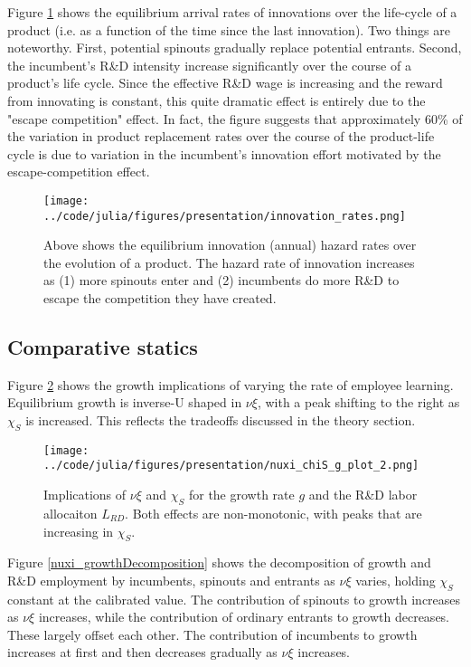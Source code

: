 \documentclass[12pt,english]{article}
\theoremstyle{remark}
\begin{document}
Figure \ref{innovation_rates} shows the equilibrium arrival rates of innovations over the life-cycle of a product (i.e. as a function of the time since the last innovation). Two things are noteworthy. First, potential spinouts gradually replace potential entrants. Second, the incumbent's R\&D intensity increase significantly over the course of a product's life cycle. Since the effective R\&D wage is increasing and the reward from innovating is constant, this quite dramatic effect is entirely due to the "escape competition" effect. In fact, the figure suggests that approximately 60\% of the variation in product replacement rates over the course of the product-life cycle is due to variation in the incumbent's innovation effort motivated by the escape-competition effect.

\begin{figure}[h] 
	\centering
	\texttt{[image: ../code/julia/figures/presentation/innovation\_rates.png]}
	\caption{Above shows the equilibrium innovation (annual) hazard rates over the evolution of a product. The hazard rate of innovation increases as (1) more spinouts enter and (2) incumbents do more R\&D to escape the competition they have created.}
	\label{innovation_rates}
\end{figure}

\subsection{Comparative statics}

Figure \ref{nuxi_chiS_gCompStat} shows the growth implications of varying the rate of employee learning. Equilibrium growth is inverse-U shaped in $\nu \xi$, with a peak shifting to the right as $\chi_S$ is increased. This reflects the tradeoffs discussed in the theory section.

\begin{figure}[h] 
	\centering
	\texttt{[image: ../code/julia/figures/presentation/nuxi\_chiS\_g\_plot\_2.png]}
	\caption{Implications of $\nu \xi$ and $\chi_S$ for the growth rate $g$ and the R\&D labor allocaiton $L_{RD}$. Both effects are non-monotonic, with peaks that are increasing in $\chi_S$.}
	\label{nuxi_chiS_gCompStat}
\end{figure}

Figure \ref{nuxi_growthDecomposition} shows the decomposition of growth and R\&D employment by incumbents, spinouts and entrants as $\nu \xi$ varies, holding $\chi_S$ constant at the calibrated value. The contribution of spinouts to growth increases as $\nu \xi$ increases, while the contribution of ordinary entrants to growth decreases. These largely offset each other. The contribution of incumbents to growth increases at first and then decreases gradually as $\nu \xi$ increases. 
\end{document}
